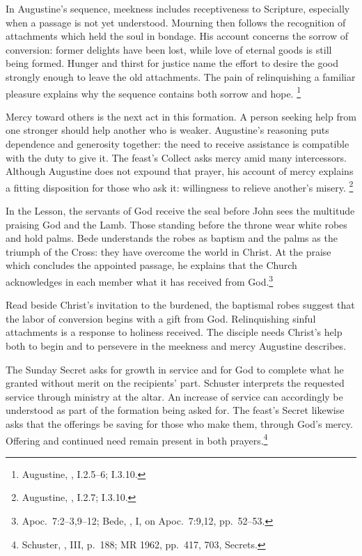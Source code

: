 In Augustine's sequence, meekness includes receptiveness to Scripture,
especially when a passage is not yet understood. Mourning then follows
the recognition of attachments which held the soul in bondage. His
account concerns the sorrow of conversion: former delights have been
lost, while love of eternal goods is still being formed. Hunger and
thirst for justice name the effort to desire the good strongly enough
to leave the old attachments. The pain of relinquishing a familiar
pleasure explains why the sequence contains both sorrow and hope.
\footnote{Augustine, , I.2.5--6; I.3.10.}

Mercy toward others is the next act in this formation. A person seeking
help from one stronger should help another who is weaker. Augustine's
reasoning puts dependence and generosity together: the need to receive
assistance is compatible with the duty to give it. The feast's Collect
asks mercy amid many intercessors. Although Augustine does not expound
that prayer, his account of mercy explains a fitting disposition for
those who ask it: willingness to relieve another's misery.
\footnote{Augustine, , I.2.7; I.3.10.}

In the Lesson, the servants of God receive the seal before John sees
the multitude praising God and the Lamb. Those standing before the
throne wear white robes and hold palms. Bede understands the robes
as baptism and the palms as the triumph of the Cross: they have
overcome the world in Christ. At the praise which concludes the
appointed passage, he explains that the Church acknowledges in
each member what it has received from God.\footnote{Apoc.~7:2--3,9--12;
Bede, , I, on Apoc.~7:9,12, pp.~52--53.}

Read beside Christ's invitation to the burdened, the baptismal
robes suggest that the labor of conversion begins with a gift
from God. Relinquishing sinful attachments is a response to
holiness received. The disciple needs Christ's help both to
begin and to persevere in the meekness and mercy Augustine describes.

The Sunday Secret asks for growth in service and for God to complete what
he granted without merit on the recipients' part. Schuster interprets
the requested service through ministry at the altar. An increase of
service can accordingly be understood as part of the formation being
asked for. The feast's Secret likewise asks that the offerings be
saving for those who make them, through God's mercy. Offering and
continued need remain present in both prayers.\footnote{Schuster,
, III, p.~188; MR 1962, pp.~417, 703, Secrets.}

